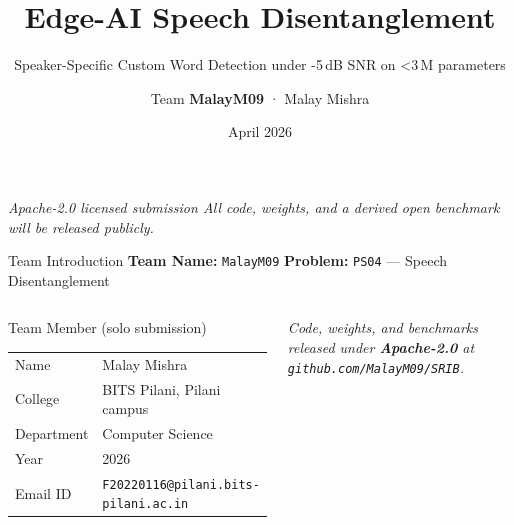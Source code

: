 \documentclass[aspectratio=169,10pt]{beamer}
\title{Edge-AI Speech Disentanglement}
\subtitle{Speaker-Specific Custom Word Detection under -5\,dB SNR on <3\,M parameters}
\author{Team \textbf{MalayM09}  ·  Malay Mishra}
\institute{Samsung \texttt{ennovateX} AX Hackathon — Phase 1 Blueprint}
\date{April 2026}
\begin{document}
\begin{frame}[plain]
  \titlepage
  \vspace{-0.8em}
  \begin{center}
    \small\color{srigray}
    \textit{Apache-2.0 licensed submission \textbar{} All code, weights, and a derived open benchmark will be released publicly.}
  \end{center}
\end{frame}

\begin{frame}{Team Introduction}
  \vspace{-0.3em}
  \textbf{\color{sriblue}Team Name:} \texttt{MalayM09} \hfill
  \textbf{\color{sriblue}Problem:} \texttt{PS04} — Speech Disentanglement
  \vspace{1.2em}

  \begin{columns}[T, onlytextwidth]
      \begin{block}{Team Member  \small\color{srigray}(solo submission)}
        \renewcommand{\arraystretch}{1.18}
        \begin{tabular}{@{}ll@{}}
          Name     & Malay Mishra \\
          College  & BITS Pilani, Pilani campus \\
          Department & Computer Science \\
          Year     & 2026 \\
          Email ID & \texttt{F20220116@pilani.bits-pilani.ac.in} \\
        \end{tabular}
      \end{block}
      \small\color{srigray}\textit{Code, weights, and benchmarks released under \textbf{Apache-2.0} at \texttt{github.com/MalayM09/SRIB}.}
  \end{columns}
\end{frame}
\end{document}

